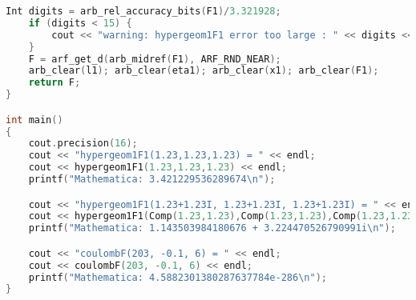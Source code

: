 \begin{lstlisting}[language=cpp]
	Int digits = arb_rel_accuracy_bits(F1)/3.321928;
	if (digits < 15) {
		cout << "warning: hypergeom1F1 error too large : " << digits << " digits" << endl;
	}
	F = arf_get_d(arb_midref(F1), ARF_RND_NEAR);
	arb_clear(l1); arb_clear(eta1); arb_clear(x1); arb_clear(F1);
	return F;
}

int main()
{
	cout.precision(16);
    cout << "hypergeom1F1(1.23,1.23,1.23) = " << endl;
	cout << hypergeom1F1(1.23,1.23,1.23) << endl;
	printf("Mathematica: 3.421229536289674\n");

	cout << "hypergeom1F1(1.23+1.23I, 1.23+1.23I, 1.23+1.23I) = " << endl;
	cout << hypergeom1F1(Comp(1.23,1.23),Comp(1.23,1.23),Comp(1.23,1.23)) << endl;
	printf("Mathematica: 1.143503984180676 + 3.224470526790991i\n");

	cout << "coulombF(203, -0.1, 6) = " << endl;
	cout << coulombF(203, -0.1, 6) << endl;
	printf("Mathematica: 4.5882301380287637784e-286\n");
}
\end{lstlisting}